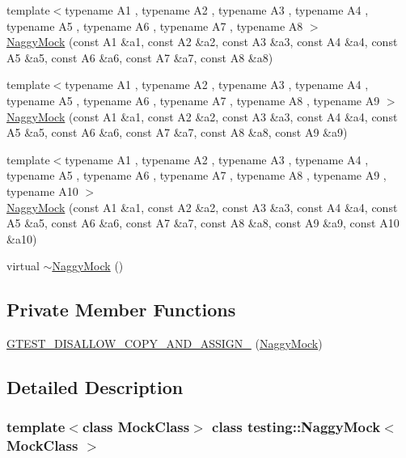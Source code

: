 \begin{DoxyCompactItemize}
\item 
{\footnotesize template$<$typename A1 , typename A2 , typename A3 , typename A4 , typename A5 , typename A6 , typename A7 , typename A8 $>$ }\\\hyperlink{classtesting_1_1NaggyMock_a63b30506f56b792ffbdc5792a9630d5e}{Naggy\+Mock} (const A1 \&a1, const A2 \&a2, const A3 \&a3, const A4 \&a4, const A5 \&a5, const A6 \&a6, const A7 \&a7, const A8 \&a8)
\item 
{\footnotesize template$<$typename A1 , typename A2 , typename A3 , typename A4 , typename A5 , typename A6 , typename A7 , typename A8 , typename A9 $>$ }\\\hyperlink{classtesting_1_1NaggyMock_a786f31ade7b8b9f6e78e07f51cc0e14b}{Naggy\+Mock} (const A1 \&a1, const A2 \&a2, const A3 \&a3, const A4 \&a4, const A5 \&a5, const A6 \&a6, const A7 \&a7, const A8 \&a8, const A9 \&a9)
\item 
{\footnotesize template$<$typename A1 , typename A2 , typename A3 , typename A4 , typename A5 , typename A6 , typename A7 , typename A8 , typename A9 , typename A10 $>$ }\\\hyperlink{classtesting_1_1NaggyMock_aa40a39806b939f423696f9380de3172b}{Naggy\+Mock} (const A1 \&a1, const A2 \&a2, const A3 \&a3, const A4 \&a4, const A5 \&a5, const A6 \&a6, const A7 \&a7, const A8 \&a8, const A9 \&a9, const A10 \&a10)
\item 
virtual \hyperlink{classtesting_1_1NaggyMock_a4d314aa583c985502eaec875440394ca}{$\sim$\+Naggy\+Mock} ()
\end{DoxyCompactItemize}
\subsection*{Private Member Functions}
\begin{DoxyCompactItemize}
\item 
\hyperlink{classtesting_1_1NaggyMock_af3b39b4a100fa43787c647fd9dbf30a8}{G\+T\+E\+S\+T\+\_\+\+D\+I\+S\+A\+L\+L\+O\+W\+\_\+\+C\+O\+P\+Y\+\_\+\+A\+N\+D\+\_\+\+A\+S\+S\+I\+G\+N\+\_\+} (\hyperlink{classtesting_1_1NaggyMock}{Naggy\+Mock})
\end{DoxyCompactItemize}


\subsection{Detailed Description}
\subsubsection*{template$<$class Mock\+Class$>$\newline
class testing\+::\+Naggy\+Mock$<$ Mock\+Class $>$}



